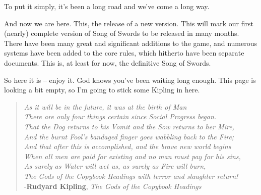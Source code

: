 \documentclass[oneside,11pt,english]{book}
\begin{document}
To put it simply, it’s been a long road and we’ve come a long way. 


\noindent And now we are here. This, the release of a new version. This will mark our first (nearly) complete 
version of Song of Swords to be released in many months. There have been many great and significant 
additions to the game, and numerous systems have been added to the core rules, which hitherto have been 
separate documents. This is, at least for now, the definitive Song of Swords. 


So here it is -- enjoy it. God knows you’ve been waiting long enough. This page is looking a bit empty, so 
I’m going to stick some Kipling in here. 
\vspace{0.8 cm}
 {\large 
\begin{verse}
\emph{As it will be in the future, it was at the birth of Man\\
There are only four things certain since Social Progress began. \\
That the Dog returns to his Vomit and the Sow returns to her Mire,\\
And the burnt Fool's bandaged finger goes wabbling back to the Fire; \\}
\vspace{0.4 cm}
\emph{And that after this is accomplished, and the brave new world begins \\ 
When all men are paid for existing and no man must pay for his sins, \\
As surely as Water will wet us, as surely as Fire will burn, \\ 
The Gods of the Copybook Headings with terror and slaughter return! \\}
\vspace{0.3 cm}
\hfill-\textbf{Rudyard Kipling}, \textit{The Gods of the Copybook Headings} 
\end{verse}}
	\newpage
\end{document}
